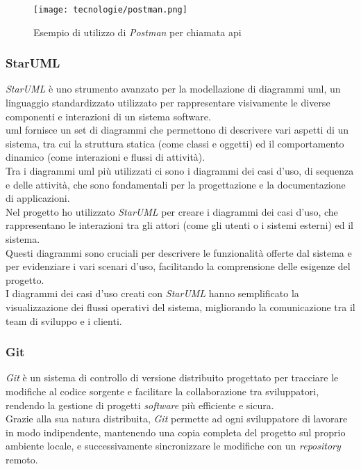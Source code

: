 \begin{figure}[H]
    \label{fig:postman}
    \centering
    \texttt{[image: tecnologie/postman.png]}
    \caption{Esempio di utilizzo di \textit{Postman} per chiamata \gls{api}}
\end{figure}

\subsubsection{StarUML}

\textit{StarUML} è uno strumento avanzato per la modellazione di diagrammi \gls{uml}, un linguaggio standardizzato utilizzato per rappresentare visivamente le diverse componenti e interazioni di un sistema software. \\
\gls{uml} fornisce un set di diagrammi che permettono di descrivere vari aspetti di un sistema,
tra cui la struttura statica (come classi e oggetti) ed il comportamento dinamico (come interazioni e flussi di attività). \\
Tra i diagrammi \gls{uml} più utilizzati ci sono i diagrammi dei casi d'uso, di sequenza e delle attività, che sono fondamentali per la progettazione e la documentazione di applicazioni.\\

\noindent Nel progetto ho utilizzato \textit{StarUML} per creare i diagrammi dei casi d'uso, che rappresentano le interazioni tra gli attori (come gli utenti o i sistemi esterni) ed il sistema.\\
Questi diagrammi sono cruciali per descrivere le funzionalità offerte dal sistema e per evidenziare i vari scenari d'uso, facilitando la comprensione delle esigenze del progetto.\\
I diagrammi dei casi d'uso creati con \textit{StarUML} hanno semplificato la visualizzazione dei flussi operativi del sistema, migliorando la comunicazione tra il team di sviluppo e i clienti.

\subsubsection{Git}

\textit{Git} è un sistema di controllo di versione distribuito progettato per tracciare le modifiche al codice sorgente e facilitare la collaborazione tra sviluppatori, rendendo la gestione di progetti \textit{software} più efficiente e sicura.\\
Grazie alla sua natura distribuita, \textit{Git} permette ad ogni sviluppatore di lavorare in modo indipendente, mantenendo una copia completa del progetto sul proprio ambiente locale, e successivamente sincronizzare le modifiche con un \textit{repository} remoto.\\

